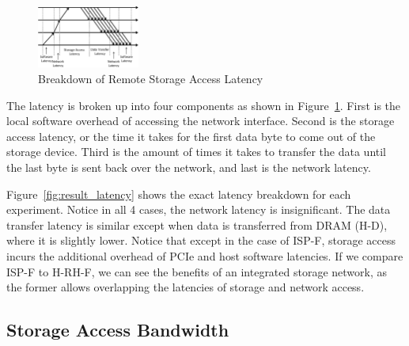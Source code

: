 \begin{figure}[b]
	\centering
	\includegraphics[width=0.30\textwidth]{figures/latencybreak-crop.pdf}
	\caption{Breakdown of Remote Storage Access Latency}
	\label{fig:latencybreak}
\end{figure}

The latency is broken up into four components as shown in Figure~\ref{fig:latencybreak}. First is the local software overhead of accessing the network
interface. Second is the storage access latency, or the time it takes for the
first data byte to come out of the storage device. Third is the amount of times
it takes to transfer the data until the last byte is sent back over the network,
and last is the network latency.

Figure~\ref{fig:result_latency} shows the exact latency breakdown for each experiment. Notice in all 4 cases, the network latency is insignificant. The data transfer latency is similar except when data is transferred from DRAM (H-D), where it is slightly lower. Notice that except in the case of ISP-F, storage access incurs the additional overhead of PCIe and host software latencies. If we compare ISP-F to H-RH-F, we can see the benefits of an integrated storage network, as the former allows overlapping the latencies of storage and network access. 

%
%


\subsection{Storage Access Bandwidth}

